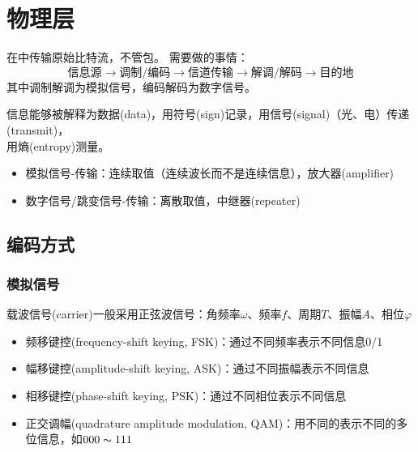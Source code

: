 
\section{物理层}
在中传输原始比特流，不管包。
需要做的事情：
\[\text{信息源}\to\text{调制/编码}\to\text{信道传输}\to\text{解调/解码}\to\text{目的地}\]
其中调制解调为模拟信号，编码解码为数字信号。

信息能够被解释为数据(data)，用符号(sign)记录，用信号(signal)（光、电）传递(transmit)，\\用熵(entropy)测量。
\begin{itemize}
	\item 模拟信号-传输：连续取值（连续波长而不是连续信息），放大器(amplifier)
	\item 数字信号/跳变信号-传输：离散取值，中继器(repeater)
\end{itemize}

\subsection{编码方式}
\subsubsection{模拟信号}
载波信号(carrier)一般采用正弦波信号：角频率$\omega$、频率$f$、周期$T$、振幅$A$、相位$\varphi$
\begin{itemize}
	\item 频移键控(frequency-shift keying, FSK)：通过不同频率表示不同信息0/1
	\item 幅移键控(amplitude-shift keying, ASK)：通过不同振幅表示不同信息
	\item 相移键控(phase-shift keying, PSK)：通过不同相位表示不同信息
	\item 正交调幅(quadrature amplitude modulation, QAM)：用不同的表示不同的多位信息，如$000\thicksim 111$
\end{itemize}

